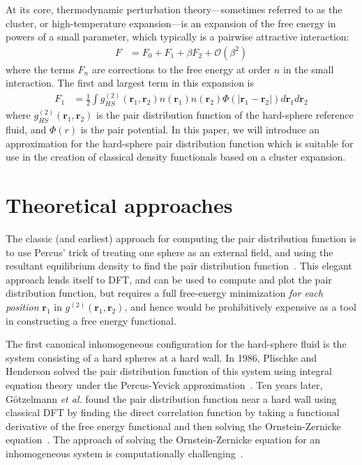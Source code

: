 \documentclass[letterpaper,twocolumn,amsmath,amssymb,pre,aps,10pt]{revtex4-1}
\newcommand{\rr}{\textbf{r}}
\begin{document}
At its core, thermodynamic perturbation theory---sometimes referred to
as the cluster, or high-temperature expansion---is an expansion of the
free energy in powers of a small parameter, which typically is a
pairwise attractive interaction:
\begin{align}
  F &= F_0 + F_1 + \beta F_2 + \mathcal{O}(\beta^2)
\end{align}
where the terms $F_n$ are corrections to the free energy at order $n$
in the small interaction.  The first and largest term in this
expansion is
\begin{align}
  F_1 &= \tfrac12 \int g^{(2)}_{HS}(\rr_1,\rr_2)n(\rr_1)n(\rr_2)\Phi(|\rr_1-\rr_2|) d\rr_1d\rr_2
\end{align}
where $g^{(2)}_{HS}(\rr_1,\rr_2)$ is the pair distribution function of
the hard-sphere reference fluid, and $\Phi(r)$ is the pair potential.
In this paper, we will introduce an approximation for the hard-sphere
pair distribution function which is suitable for use in the creation
of classical density functionals based on a cluster expansion.

\section{Theoretical approaches}

The classic (and earliest) approach for computing the pair
distribution function is to use Percus' trick of treating one sphere
as an external field, and using the resultant equilibrium density to
find the pair distribution function~\cite{hansen2006theory}.  This
elegant approach lends itself to DFT, and can be used to compute and
plot the pair distribution function, but requires a full free-energy
minimization \emph{for each position} $\rr_1$ in
$g^{(2)}(\rr_1,\rr_2)$, and hence would be prohibitively expensive as
a tool in constructing a free energy functional.

The first canonical inhomogeneous configuration for the hard-sphere
fluid is the system consisting of a hard spheres at a hard wall.  In
1986, Plischke and Henderson solved the pair distribution function of
this system using integral equation theory under the Percus-Yevick
approximation~\cite{plischke1986pair}.  Ten years later,
G{\"o}tzelmann \emph{et al.} found the pair distribution function near
a hard wall using classical DFT by finding the direct correlation
function by taking a functional derivative of the free energy
functional and then solving the Ornstein-Zernicke
equation~\cite{gotzelmann1996structure}.  The approach of solving the
Ornstein-Zernicke equation for an inhomogeneous system is
computationally challenging~\cite{paul2003variational}.
\end{document}

